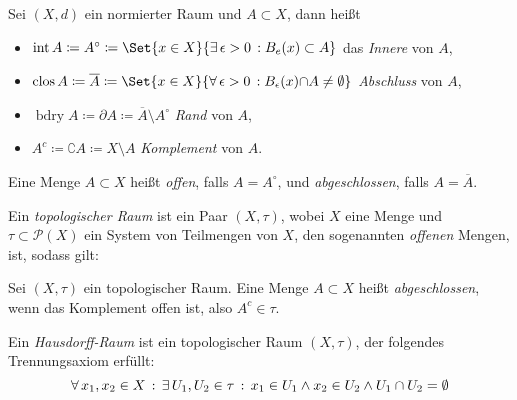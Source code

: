 \documentclass{cheat-sheet}
\newcommand{\inte}{\mathop{\mathrm{int}}} %
\newcommand{\clos}{\mathop{\mathrm{clos}}} %
\newcommand{\bdry}{\mathop{\mathrm{bdry}}} %
\begin{document}
\begin{defn}
  Sei $(X, d)$ ein normierter Raum und $A \subset X$, dann heißt
  \begin{itemize}
    \item $\inte A \coloneqq A^\circ \coloneqq \Set{x \in X}{ \ex{\epsilon > 0} \! B_e(x) \subset A }$ das \emph{Innere} von $A$,
    \item $\clos A \coloneqq \overline{A} \coloneqq \Set{x \in X}{ \fa{\epsilon > 0} \! B_\epsilon(x) {\cap} A \not= \emptyset }$ \emph{Abschluss} von $A$,
    \item $\bdry A \coloneqq \partial A \coloneqq \overline{A} \setminus A^\circ$ \emph{Rand} von $A$,
    \item $A^c \coloneqq \complement A \coloneqq X \setminus A$ \emph{Komplement} von $A$.
  \end{itemize}
\end{defn}

\begin{defn}
  Eine Menge $A \subset X$ heißt \emph{offen}, falls $A = A^\circ$, und \emph{abgeschlossen}, falls $A = \overline{A}$.
\end{defn}


\begin{defn}
  Ein \emph{topologischer Raum} ist ein Paar $(X, \tau)$, wobei $X$ eine Menge und $\tau \subset \mathcal{P}(X)$ ein System von Teilmengen von $X$, den sogenannten \emph{offenen} Mengen, ist, sodass gilt:
  \vspace{-4pt}
  \begin{itemize}
  \end{itemize}
\end{defn}

\begin{defn}
  Sei $(X, \tau)$ ein topologischer Raum. Eine Menge $A \subset X$ heißt \emph{abgeschlossen}, wenn das Komplement offen ist, also $A^c \in \tau$.
\end{defn}

\begin{defn}
  Ein \emph{Hausdorff-Raum} ist ein topologischer Raum $(X, \tau)$, der folgendes Trennungsaxiom erfüllt:
  \[ \forall \, {x_1, x_2 \in X} \,:\, \exists \, {U_1, U_2 \in \tau} \,:\, x_1 \in U_1 \wedge x_2 \in U_2 \wedge U_1 \cap U_2 = \emptyset \]
\end{defn}
\end{document}
